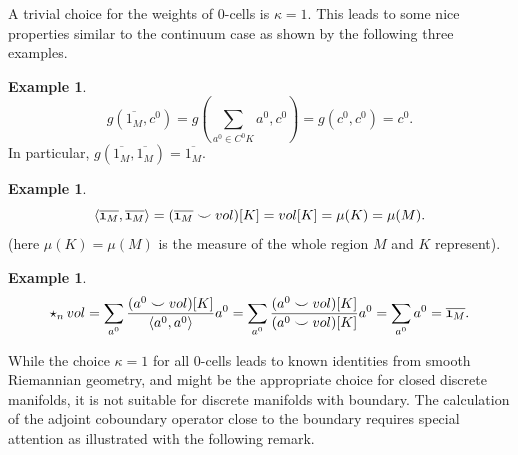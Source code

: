 \documentclass{elsarticle}
\theoremstyle{definition}
\newtheorem{example}[theorem]{Example}
\newcommand{\inner}[2]{\langle#1,#2\rangle}
\newcommand{\vol}{\mathop{\rm vol}\nolimits} %
\begin{document}
A trivial choice for the weights of 0-cells is $\kappa = 1$. This leads to some nice properties similar to the continuum case as shown by the following three examples.
\begin{example}
  \begin{equation}
    g(\overline{\mathfrak{1}_M}, c^0)
      = g\left(\sum_{a^0 \in C^0 K} a^0, c^0\right)
      = g(c^0, c^0)
      = c^0.
  \end{equation}
  In particular, 
  $g(\overline{\mathfrak{1}_M}, \overline{\mathfrak{1}_M})
    = \overline{\mathfrak{1}_M}$.
\end{example}
\begin{example}
  \begin{equation}
    \inner{\overline{\mathfrak{1}_M}}{\overline{\mathfrak{1}_M}}
      = (\overline{\mathfrak{1}_M} \smile \vol)[K]
      = \vol[K]
      = \mu(K)
      = \mu(M).
  \end{equation}
  (here $\mu(K) = \mu(M)$ is the measure of the whole region $M$ and $K$ represent).
\end{example}
\begin{example}
  \begin{equation}
    \star_n \vol
      = \sum_{a^0} \frac{(a^0 \smile \vol)[K]}{\inner{a^0} {a^0}} a^0
      = \sum_{a^0} \frac{(a^0 \smile \vol)[K]}{(a^0 \smile \vol)[K]} a^0
      = \sum_{a^0} a^0
      = \overline{\mathfrak{1}_M}.
  \end{equation}
\end{example}
While the choice $\kappa = 1$ for all 0-cells leads to known identities from smooth Riemannian geometry, and might be the appropriate choice for closed discrete manifolds, it is not suitable for discrete manifolds with boundary. The calculation of the adjoint coboundary operator close to the boundary requires special attention as illustrated with the following remark.
\end{document}
